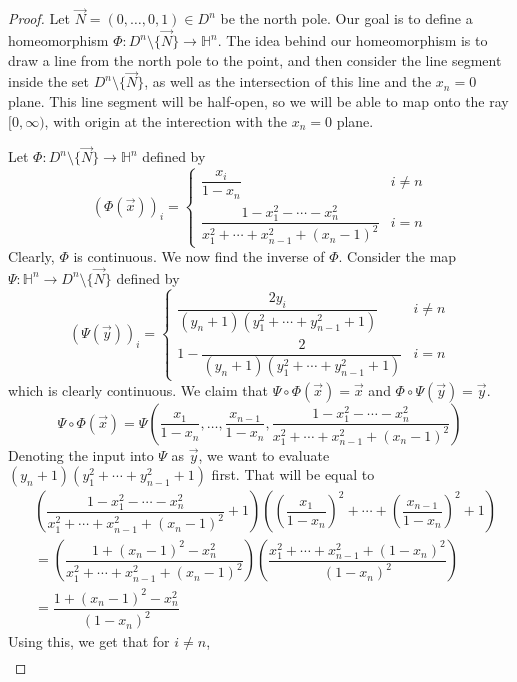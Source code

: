 \documentclass{article}
\renewcommand{\H}{\mathbb{H}}
\theoremstyle{plain} %
\numberwithin{thm}{section} %
\theoremstyle{definition} %
\begin{document}
\begin{proof}
Let $\vec{N} = (0, \dots, 0, 1) \in D^n$ be the north pole. Our goal is to define a homeomorphism $\Phi: D^n \setminus \{\vec{N}\} \to \H^n$. The idea behind our homeomorphism is to draw a line from the north pole to the point, and then consider the line segment inside the set $D^n \setminus \{\vec{N}\}$, as well as the intersection of this line and the $x_n = 0$ plane. This line segment will be half-open, so we will be able to map onto the ray $[0, \infty)$, with origin at the interection with the $x_n = 0$ plane.

Let $\Phi: D^n \setminus \{\vec{N}\} \to \H^n$ defined by
\[
    (\Phi(\vec{x}))_i = \begin{cases}
        \dfrac{x_i}{1 - x_n} & i \neq n \\
        \dfrac{1 - x_1^2 - \cdots - x_n^2}{x_1^2 + \cdots + x_{n - 1}^2 + (x_n - 1)^2} & i = n
    \end{cases}
\]
Clearly, $\Phi$ is continuous. We now find the inverse of $\Phi$. Consider the map $\Psi: \H^n \to D^n \setminus \{\vec{N}\}$ defined by
\[
    (\Psi(\vec{y}))_i = \begin{cases}
        \dfrac{2y_i}{(y_n + 1)(y_1^2 + \cdots + y_{n - 1}^2 + 1)} & i \neq n \\
        1 - \dfrac{2}{(y_n + 1)(y_1^2 + \cdots + y_{n - 1}^2 + 1)} & i = n
    \end{cases}
\]
which is clearly continuous. We claim that $\Psi \circ \Phi (\vec{x}) = \vec{x}$ and $\Phi \circ \Psi (\vec{y}) = \vec{y}$.
\[
    \Psi \circ \Phi (\vec{x}) 
    = \Psi\left(\dfrac{x_1}{1 - x_n}, \dots, \dfrac{x_{n - 1}}{1 - x_n}, \dfrac{1 - x_1^2 - \cdots - x_n^2}{x_1^2 + \cdots + x_{n - 1}^2 + (x_n - 1)^2}\right)
\]
Denoting the input into $\Psi$ as $\vec{y}$, we want to evaluate $(y_n + 1)(y_1^2 + \cdots + y_{n - 1}^2 + 1)$ first. That will be equal to
\begin{align*}
    &\left(\dfrac{1 - x_1^2 - \cdots - x_n^2}{x_1^2 + \cdots + x_{n - 1}^2 + (x_n - 1)^2} + 1\right)\left(\left(\dfrac{x_1}{1 - x_n}\right)^2 + \cdots + \left(\dfrac{x_{n - 1}}{1 - x_n}\right)^2 + 1\right) \\
    &= \left(\dfrac{1 + (x_n - 1)^2 - x_n^2}{x_1^2 + \cdots + x_{n - 1}^2 + (x_n - 1)^2}\right)\left(\dfrac{x_1^2 + \cdots + x_{n - 1}^2 + (1 - x_n)^2}{(1 - x_n)^2}\right) \\
    &= \dfrac{1 + (x_n - 1)^2 - x_n^2}{(1 - x_n)^2}
\end{align*}
Using this, we get that for $i \neq n$,
\begin{align*}

\end{align*}
\end{proof}
\end{document}
